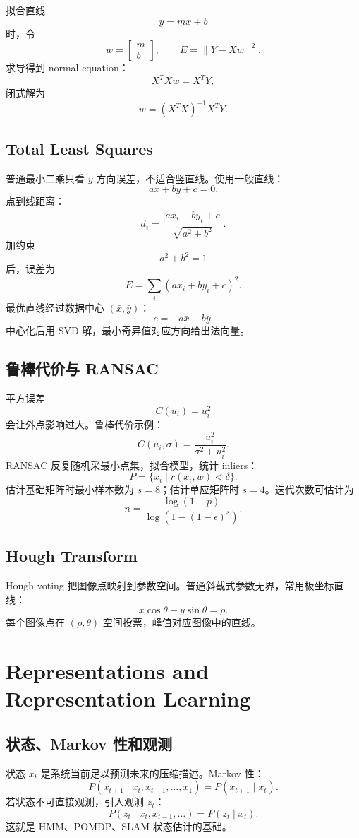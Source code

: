 \documentclass[11pt]{article}
\begin{document}
拟合直线
\[
  y=mx+b
\]
时，令
\[
  w=
  \begin{bmatrix}
    m\\b
  \end{bmatrix},
\qquad
  E=\|Y-Xw\|^2.
\]
求导得到 normal equation：
\[
  X^TXw=X^TY,
\]
闭式解为
\[
  w=(X^TX)^{-1}X^TY.
\]

\subsection{Total Least Squares}

普通最小二乘只看 $y$ 方向误差，不适合竖直线。使用一般直线：
\[
  ax+by+c=0.
\]
点到线距离：
\[
  d_i=\frac{|ax_i+by_i+c|}{\sqrt{a^2+b^2}}.
\]
加约束
\[
  a^2+b^2=1
\]
后，误差为
\[
  E=\sum_i(ax_i+by_i+c)^2.
\]
最优直线经过数据中心 $(\bar x,\bar y)$：
\[
  c=-a\bar x-b\bar y.
\]
中心化后用 SVD 解，最小奇异值对应方向给出法向量。

\subsection{鲁棒代价与 RANSAC}

平方误差
\[
  C(u_i)=u_i^2
\]
会让外点影响过大。鲁棒代价示例：
\[
  C(u_i,\sigma)=\frac{u_i^2}{\sigma^2+u_i^2}.
\]
RANSAC 反复随机采最小点集，拟合模型，统计 inliers：
\[
  P=\{x_i\mid r(x_i,w)<\delta\}.
\]
估计基础矩阵时最小样本数为 $s=8$；估计单应矩阵时 $s=4$。迭代次数可估计为
\[
  n=\frac{\log(1-p)}
  {\log(1-(1-\epsilon)^s)}.
\]

\subsection{Hough Transform}

Hough voting 把图像点映射到参数空间。普通斜截式参数无界，常用极坐标直线：
\[
  x\cos\theta+y\sin\theta=\rho.
\]
每个图像点在 $(\rho,\theta)$ 空间投票，峰值对应图像中的直线。

\section{Representations and Representation Learning}

\subsection{状态、Markov 性和观测}

状态 $x_t$ 是系统当前足以预测未来的压缩描述。Markov 性：
\[
  P(x_{t+1}\mid x_t,x_{t-1},\dots,x_1)=P(x_{t+1}\mid x_t).
\]
若状态不可直接观测，引入观测 $z_t$：
\[
  P(z_t\mid x_t,x_{t-1},\dots)=P(z_t\mid x_t).
\]
这就是 HMM、POMDP、SLAM 状态估计的基础。
\end{document}
